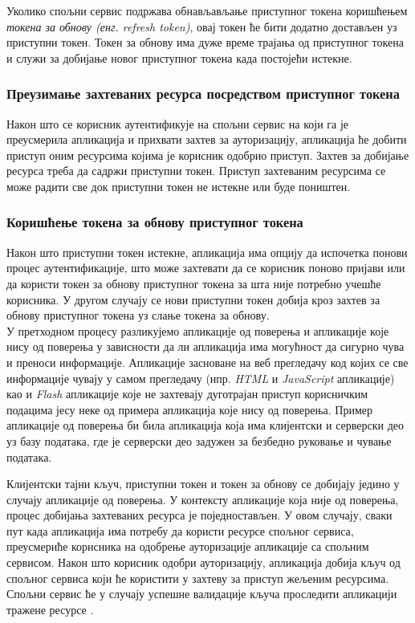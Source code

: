 \documentclass[12pt,oneside]{memoir}
\begin{document}
Уколико спољни сервис подржава обнављављање приступног токена коришћењем 
\textit{токена за обнову (енг. refresh token)}, овај токен ће бити додатно достављен уз приступни токен. Токен за обнову има дуже време трајања од приступног токена и служи за добијање новог приступног токена када постојећи истекне.


\subsubsection*{Преузимање захтеваних ресурса посредством приступног токена}

Након што се корисник аутентификује на спољни сервис на који га је преусмерила апликација и прихвати захтев за ауторизацију,
апликација ће добити приступ оним ресурсима којима је корисник одобрио приступ. Захтев за добијање ресурса треба да садржи приступни токен. 
Приступ захтеваним ресурсима се може радити све док приступни токен не истекне или буде поништен.

\subsubsection*{Коришћење токена за обнову приступног токена}

Након што приступни токен истекне, апликација има опцију да испочетка понови процес аутентификације, што може захтевати да се корисник поново пријави или да користи токен за обнову приступног токена за шта није потребно учешће корисника. У другом случају се нови приступни токен добија кроз захтев за обнову приступног токена уз слање токена за обнову. \\

У претходном процесу разликујемо апликације од поверења и апликације које нису од поверења у зависности да ли 
апликација има могућност да сигурно чува и преноси информације. Апликације засноване на веб прегледачу код којих се све информације чувају у самом прегледачу (нпр. \textit{HTML} и \textit{JavaScript} апликације) као и \textit{Flash} апликације које не захтевају дуготрајан приступ корисничким подацима јесу неке од примера апликација које нису од поверења. Пример апликације од поверења би била апликација која има клијентски и серверски део уз базу података, где је серверски део задужен за безбедно руковање и чување података.

Клијентски тајни кључ, приступни токен и токен за обнову се добијају једино у случају апликације од поверења. 
У контексту апликације која није од поверења, процес добијања захтеваних ресурса је поједностављен. У овом случају, 
сваки пут када апликација има потребу да користи ресурсе спољног сервиса, преусмериће корисника на одобрење 
ауторизације апликације са спољним сервисом. Након што корисник одобри ауторизацију, апликација добија кључ 
од спољног сервиса који ће користити у захтеву за приступ жељеним ресурсима. Спољни сервис ће у случају успешне
валидације кључа проследити апликацији тражене ресурсе \cite{mastering_oauth2}.
\end{document}

